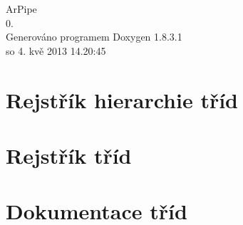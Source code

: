 \documentclass{book}
\begin{document}
\hypersetup{pageanchor=false,citecolor=blue}
\begin{titlepage}
\vspace*{7cm}
\begin{center}
{\Large Ar\-Pipe \\[1ex]\large 0. }\\
\vspace*{1cm}
{\large Generováno programem Doxygen 1.8.3.1}\\
\vspace*{0.5cm}
{\small so 4. kvě 2013 14.20:45}\\
\end{center}
\end{titlepage}
\clearemptydoublepage
{}
\tableofcontents
\clearemptydoublepage
{}
\hypersetup{pageanchor=true,citecolor=blue}
\chapter{Rejstřík hierarchie tříd}

\chapter{Rejstřík tříd}

\chapter{Dokumentace tříd}























\printindex
\end{document}
